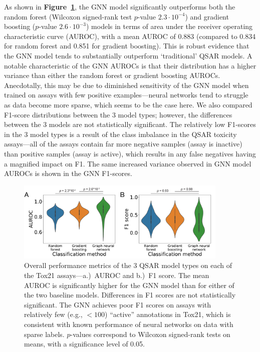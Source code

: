 \documentclass{ws-procs11x85}
\begin{document}
As shown in \textbf{Figure~\ref{fig:3}}, the GNN model significantly outperforms both the random forest (Wilcoxon signed-rank test $p$-value $2.3\cdot10^{-4}$) and gradient boosting ($p$-value $2.6\cdot10^{-3}$) models in terms of area under the receiver operating characteristic curve (AUROC), with a mean AUROC of 0.883 (compared to 0.834 for random forest and 0.851 for gradient boosting).
This is robust evidence that the GNN model tends to substantially outperform `traditional' QSAR models.
A notable characteristic of the GNN AUROCs is that their distribution has a higher variance than either the random forest or gradient boosting AUROCs.
Anecdotally, this may be due to diminished sensitivity of the GNN model when trained on assays with few positive examples---neural networks tend to struggle as data become more sparse, which seems to be the case here.
We also compared F1-score distributions between the 3 model types; however, the differences between the 3 models are not statistically significant.
The relatively low F1-scores in the 3 model types is a result of the class imbalance in the QSAR toxicity assays---all of the assays contain far more negative samples (assay is inactive) than positive samples (assay is active), which results in any false negatives having a magnified impact on F1.
The same increased variance observed in GNN model AUROCs is shown in the GNN F1-scores.

\begin{figure}
   \centering
   \includegraphics[width=0.9\textwidth]{figures/figure3.pdf}
   \caption{Overall performance metrics of the 3 QSAR model types on each of the Tox21 assays---a.)~AUROC and b.)~F1 score. The mean AUROC is significantly higher for the GNN model than for either of the two baseline models. Differences in F1 scores are not statistically significant. The GNN achieves poor F1 scores on assays with relatively few (e.g., $< 100$) ``active'' annotations in Tox21, which is consistent with known performance of neural networks on data with sparse labels. $p$-values correspond to Wilcoxon signed-rank tests on means, with a significance level of 0.05.}\label{fig:3}
\end{figure}
\end{document}
